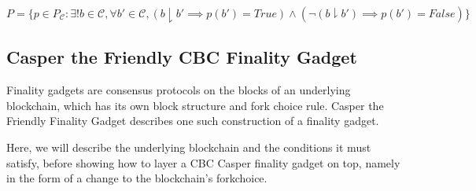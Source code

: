 \begin{defn}
$$
P = \{p \in P_{\mathcal{C}} : \exists! b \in \mathcal{C}, \forall b' \in \mathcal{C}, (b \downharpoonright b' \implies p(b') = True) \land (\neg(b \downharpoonright b') \implies p(b') = False)\}
$$
\end{defn}


\iffalse
\begin{thm}
$\forall p \in P$,
$$
Max\_Weight(p)
$$
\end{thm}
\fi



\subsection{Casper the Friendly CBC Finality Gadget}

Finality gadgets are consensus protocols on the blocks of an underlying blockchain, which has its own block structure and fork choice rule. Casper the Friendly Finality Gadget\cite{vitalik2017casperffg} describes one such construction of a finality gadget.

Here, we will describe the underlying blockchain and the conditions it must satisfy, before showing how to layer a CBC Casper finality gadget on top, namely in the form of a change to the blockchain's forkchoice.

